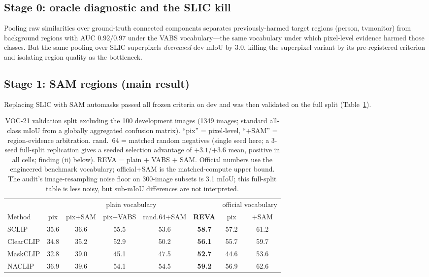 \documentclass[11pt]{article}
\newcommand{\miou}{mIoU}
\newcommand{\reva}{REVA}
\begin{document}
\subsection{Stage 0: oracle diagnostic and the SLIC kill}
\label{sec:oracle}
Pooling raw similarities over ground-truth connected components separates
previously-harmed target regions (person, tvmonitor) from background regions with AUC
$0.92$/$0.97$ under the VABS vocabulary---the same vocabulary under which pixel-level
evidence harmed those classes. But the same pooling over SLIC superpixels
\emph{decreased} dev \miou{} by $3.0$, killing the superpixel variant by its
pre-registered criterion and isolating region quality as the bottleneck.

\subsection{Stage 1: SAM regions (main result)}
Replacing SLIC with SAM automasks passed all frozen criteria on dev and was then
validated on the full split (Table~\ref{tab:main}).

\begin{table}[t]
\centering\small
\caption{VOC-21 validation split excluding the 100 development images (1349 images;
standard all-class \miou{} from a globally aggregated confusion matrix). ``pix'' =
pixel-level, ``+SAM'' = region-evidence arbitration. rand.\ 64 = matched random
negatives (single seed here; a 3-seed full-split replication gives a seeded
selection advantage of $+3.1$/$+3.6$ mean, positive in all cells; finding (ii) below). \reva{} = plain + VABS + SAM. Official numbers use the
engineered benchmark vocabulary; official+SAM is the matched-compute upper bound.
The audit's image-resampling noise floor on 300-image subsets is 3.1 \miou{};
this full-split table is less noisy, but sub-\miou{} differences are not interpreted.}
\label{tab:main}
\begin{tabular}{lccccccc}
\toprule
& \multicolumn{5}{c}{plain vocabulary} & \multicolumn{2}{c}{official vocabulary} \\
\cmidrule(lr){2-6}\cmidrule(lr){7-8}
Method & pix & pix+SAM & pix+VABS & rand.64+SAM & \textbf{\reva{}} & pix & +SAM \\
\midrule
SCLIP     & 35.6 & 36.6 & 55.5 & 53.6 & \textbf{58.7} & 57.2 & 61.2 \\
ClearCLIP & 34.8 & 35.2 & 52.9 & 50.2 & \textbf{56.1} & 55.7 & 59.7 \\
MaskCLIP  & 32.8 & 39.0 & 45.1 & 47.5 & \textbf{52.7} & 44.6 & 53.6 \\
NACLIP    & 36.9 & 39.6 & 54.1 & 54.5 & \textbf{59.2} & 56.9 & 62.6 \\
\bottomrule
\end{tabular}
\end{table}
\end{document}
